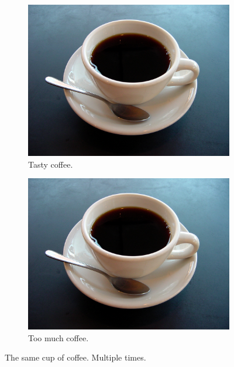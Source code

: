 \documentclass{article}
\begin{document}
\begin{figure}[h!]
\begin{subfigure}[b]{0.2\linewidth}
        \includegraphics[width=\linewidth]{coffee.jpg}
        \caption{Tasty coffee.}
    \end{subfigure}
    \begin{subfigure}[b]{0.5\linewidth}
        \includegraphics[width=\linewidth]{coffee.jpg}
        \caption{Too much coffee.}
    \end{subfigure}
    \caption{The same cup of coffee. Multiple times.}
    \label{fig:coffee3}
\end{figure}


\newpage
\end{document}
